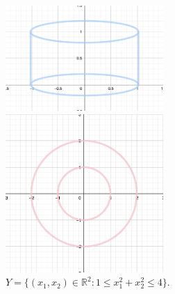\documentclass[a4paper,11pt]{article}
\begin{document}
\begin{figure}[ht]
     \begin{minipage}{0.45\textwidth}
         \centering
         \includegraphics[width=60mm]{X_n2.png}
         \caption{$X = S^1 \times [0,1] \subset \mathbb{R}^3$.}
       \end{minipage}\hfill
     \begin{minipage}{0.55\textwidth}
         \centering
         \includegraphics[width=60mm]{Y_n2.png}
         \caption{$ Y = \{ (x_1, x_2) \in \mathbb{R}^2 : 1 \leq x_1^2 + x_2^2 \leq 4 \}$.}
       \end{minipage}\hfill
    \end{figure}
\end{document}
